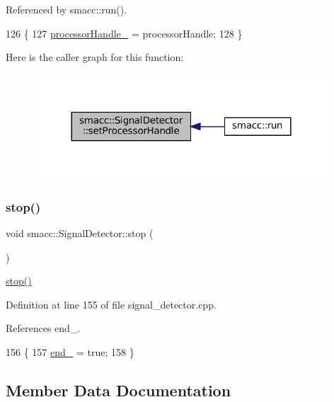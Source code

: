 Referenced by smacc\+::run().


\begin{DoxyCode}
126 \{
127     \hyperlink{classsmacc_1_1SignalDetector_a9a77dc9f0e9f8f56dff5e76077abcb78}{processorHandle\_} = processorHandle;
128 \}
\end{DoxyCode}
Here is the caller graph for this function\+:
\nopagebreak
\begin{figure}[H]
\begin{center}
\leavevmode
\includegraphics[width=312pt]{classsmacc_1_1SignalDetector_ac1197a77c32a3b817005391e550ce646_icgraph}
\end{center}
\end{figure}
\mbox{\label{classsmacc_1_1SignalDetector_a536ea005ea4ef4632c0c9c1c62c557a3}} 
\subsubsection{\texorpdfstring{stop()}{stop()}}
{\footnotesize\ttfamily void smacc\+::\+Signal\+Detector\+::stop (\begin{DoxyParamCaption}{ }\end{DoxyParamCaption})}

\hyperlink{classsmacc_1_1SignalDetector_a536ea005ea4ef4632c0c9c1c62c557a3}{stop()} 

Definition at line 155 of file signal\+\_\+detector.\+cpp.



References end\+\_\+.


\begin{DoxyCode}
156 \{
157     \hyperlink{classsmacc_1_1SignalDetector_aaee266393c01693528a2d74b1f2354a2}{end\_} = \textcolor{keyword}{true};
158 \}
\end{DoxyCode}


\subsection{Member Data Documentation}
\mbox{\label{classsmacc_1_1SignalDetector_aaee266393c01693528a2d74b1f2354a2}} 
